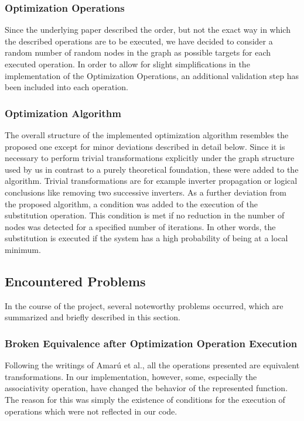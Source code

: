 \documentclass[
	accentcolor=1c,%
	type=intern,
	marginpar=false,
	ruledheaders=section,
	class=report,
	BCOR=5mm,
      parskip=half-,
	fontsize=10pt
	]{tudapub}
\begin{document}
		\subsubsection{Optimization Operations}
			Since the underlying paper described the order, but not the exact way in which the described operations are to be executed, we have decided to consider a random number of random nodes in the graph as possible targets for each executed operation.
			In order to allow for slight simplifications in the implementation of the Optimization Operations, an additional validation step has been included into each operation.
		\subsubsection{Optimization Algorithm}
			The overall structure of the implemented optimization algorithm resembles the proposed one except for minor deviations described in detail below.
			Since it is necessary to perform trivial transformations explicitly under the graph structure used by us in contrast to a purely theoretical foundation, these were added to the algorithm.
			Trivial transformations are for example inverter propagation or logical conclusions like removing two successive inverters.
			As a further deviation from the proposed algorithm, a condition was added to the execution of the substitution operation.
			This condition is met if no reduction in the number of nodes was detected for a specified number of iterations. In other words, the substitution is executed if the system has a high probability of being at a local minimum.

	\subsection{Encountered Problems}
		In the course of the project, several noteworthy problems occurred, which are summarized and briefly described in this section.
		\subsubsection{Broken Equivalence after Optimization Operation Execution}
			Following the writings of Amarú et al., all the operations presented are equivalent transformations.
			In our implementation, however, some, especially the associativity operation, have changed the behavior of the represented function.
			The reason for this was simply the existence of conditions for the execution of operations which were not reflected in our code.
\end{document}
